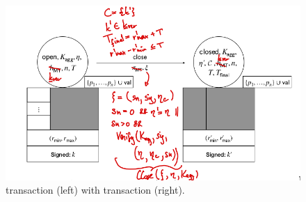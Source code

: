 \begin{figure}

  \centering

  \includegraphics[width=\textwidth/2]{figures/SM_open_closed.png}

  \caption{\mtxCCom{} transaction (left) with \mtxClose{} transaction
    (right).}\label{fig:SM_open_closed}

\end{figure}



